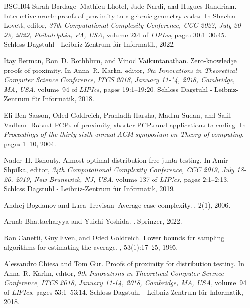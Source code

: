 \documentclass[10pt,a4paper]{article}
\begin{document}
\begin{thebibliography}{BSGH{\etalchar{+}}04}
Sarah Bordage, Mathieu Lhotel, Jade Nardi, and Hugues Randriam.
\newblock Interactive oracle proofs of proximity to algebraic geometry codes.
\newblock In Shachar Lovett, editor, {\em 37th Computational Complexity
  Conference, {CCC} 2022, July 20-23, 2022, Philadelphia, PA, {USA}}, volume
  234 of {\em LIPIcs}, pages 30:1--30:45. Schloss Dagstuhl - Leibniz-Zentrum
  f{\"{u}}r Informatik, 2022.

Itay Berman, Ron~D. Rothblum, and Vinod Vaikuntanathan.
\newblock Zero-knowledge proofs of proximity.
\newblock In Anna~R. Karlin, editor, {\em 9th Innovations in Theoretical
  Computer Science Conference, {ITCS} 2018, January 11-14, 2018, Cambridge, MA,
  {USA}}, volume~94 of {\em LIPIcs}, pages 19:1--19:20. Schloss Dagstuhl -
  Leibniz-Zentrum f{\"{u}}r Informatik, 2018.

Eli Ben-Sasson, Oded Goldreich, Prahladh Harsha, Madhu Sudan, and Salil Vadhan.
\newblock Robust {PCP}s of proximity, shorter {PCP}s and applications to
  coding.
\newblock In {\em Proceedings of the thirty-sixth annual ACM symposium on
  Theory of computing}, pages 1--10, 2004.

Nader~H. Bshouty.
\newblock Almost optimal distribution-free junta testing.
\newblock In Amir Shpilka, editor, {\em 34th Computational Complexity
  Conference, {CCC} 2019, July 18-20, 2019, New Brunswick, NJ, {USA}}, volume
  137 of {\em LIPIcs}, pages 2:1--2:13. Schloss Dagstuhl - Leibniz-Zentrum
  f{\"{u}}r Informatik, 2019.

Andrej Bogdanov and Luca Trevisan.
\newblock Average-case complexity.
, 2(1), 2006.

Arnab Bhattacharyya and Yuichi Yoshida.
.
\newblock Springer, 2022.

Ran Canetti, Guy Even, and Oded Goldreich.
\newblock Lower bounds for sampling algorithms for estimating the average.
, 53(1):17--25, 1995.

Alessandro Chiesa and Tom Gur.
\newblock Proofs of proximity for distribution testing.
\newblock In Anna~R. Karlin, editor, {\em 9th Innovations in Theoretical
  Computer Science Conference, {ITCS} 2018, January 11-14, 2018, Cambridge, MA,
  {USA}}, volume~94 of {\em LIPIcs}, pages 53:1--53:14. Schloss Dagstuhl -
  Leibniz-Zentrum f{\"{u}}r Informatik, 2018.


\end{thebibliography}
\end{document}
